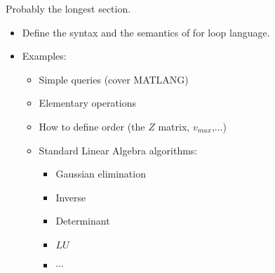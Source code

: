 Probably the longest section.


\begin{itemize}
\item Define the syntax and the semantics of for loop language. 
\item Examples:
\begin{itemize}
\item Simple queries (cover MATLANG)
\item Elementary operations
\item How to define order (the $Z$ matrix, $v_{max}$,...)
\item Standard Linear Algebra algorithms:
\begin{itemize}
\item Gaussian elimination
\item Inverse
\item Determinant
\item $LU$
\item $\cdots$
\end{itemize}
\end{itemize}
\end{itemize}
